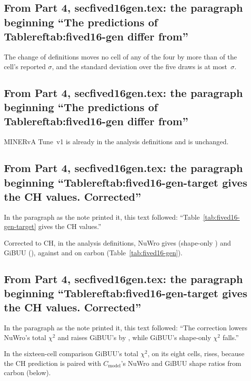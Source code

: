 \subsection{From Part 4, secfived16gen.tex: the paragraph beginning ``The predictions of Tablereftab:fived16-gen differ from''}
The change of definitions moves no cell of any of the four by more than  of the cell's reported $\sigma$, and the standard deviation over the five draws is at most \,$\sigma$.

\subsection{From Part 4, secfived16gen.tex: the paragraph beginning ``The predictions of Tablereftab:fived16-gen differ from''}
MINERvA Tune~v1 is already in the analysis definitions and is unchanged.

\subsection{From Part 4, secfived16gen.tex: the paragraph beginning ``Tablereftab:fived16-gen-target gives the CH values. Corrected''}
In the paragraph as the note printed it, this text followed: ``Table~\ref{tab:fived16-gen-target} gives the CH values.''\par
Corrected to CH, in the analysis definitions, NuWro gives  (shape-only ) and GiBUU  (), against  and  on carbon (Table~\ref{tab:fived16-gen}).

\subsection{From Part 4, secfived16gen.tex: the paragraph beginning ``Tablereftab:fived16-gen-target gives the CH values. Corrected''}
In the paragraph as the note printed it, this text followed: ``The correction lowers NuWro's total $\chi^2$ and raises GiBUU's by , while GiBUU's shape-only $\chi^2$ falls.''\par
In the sixteen-cell comparison GiBUU's total $\chi^2$, on its eight cells, rises, because the CH prediction is paired with $C_{\mathrm{model}}$'s NuWro and GiBUU shape ratios from carbon (below).

